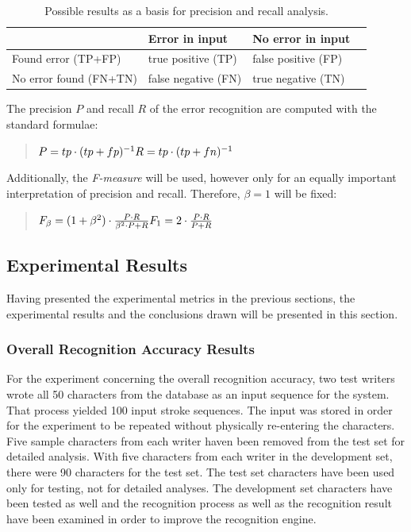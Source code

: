 \begin{table}[htbp]
\begin{center}
  \begin{tabular}{|l|l|l|p{200pt}|}
    \hline
                           & Error in input      & No error in input \\
    \hline
    Found error (TP+FP)    & true positive (TP)  & false positive (FP) \\
    \hline
    No error found (FN+TN) & false negative (FN) & true negative (TN) \\
    \hline
  \end{tabular}
\end{center}
\caption{Possible results as a basis for precision and recall analysis.}
\label{table:eval:resultsforprecisionandrecall}
\end{table}
The precision \(P\) and recall \(R\) of the error recognition are computed 
with the standard formulae:
\begin{quote}
\(
P=tp \cdot (tp+fp)^{-1} \\
R=tp \cdot (tp+fn)^{-1} \\
\)  
\end{quote}
Additionally, the \emph{F-measure} will be used, however only for an equally 
important interpretation of precision and recall. Therefore, \(\beta = 1\) will
be fixed:
\begin{quote}
\(
F_{\beta} = (1 + \beta^2) \cdot \frac{P \cdot R }{ \beta^2 \cdot P + R} \\
F_{1} = 2 \cdot \frac{P \cdot R }{P + R} \\
\)
\end{quote}

\subsection{Experimental Results}
\label{sec:eval:experimentalresults}

Having presented the experimental metrics in the previous sections, 
the experimental results and the conclusions drawn will be presented in this 
section.

\subsubsection{Overall Recognition Accuracy Results}
\label{sec:eval:resultsoverallrecognition}

For the experiment concerning the overall recognition accuracy, two test writers 
wrote all 50 characters from the database as an input sequence for the system.
That process yielded 100 input stroke sequences.
The input was stored in order for the experiment to be repeated without
physically re-entering the characters. Five sample characters from each 
writer haven been removed from the test set for detailed analysis.
With five characters from each writer in the development set, there were 
90 characters for the test set.
The test set characters have been used only for testing, not for 
detailed analyses. The development set characters have been tested as well
and the recognition process as well as the recognition result have been 
examined in order to improve the recognition engine.

